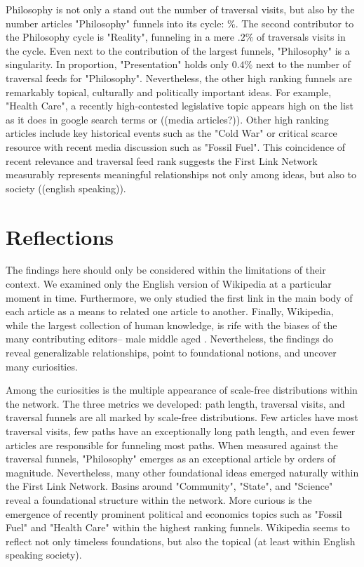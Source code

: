 \documentclass[twoside]{article}
\newcommand{\red}[1]{{\leavevmode\color{sred}{#1}}} %
\begin{document}
Philosophy is not only a stand out the number of traversal visits, but also by the number articles "Philosophy" funnels into
its cycle: \red{[[99.something]]} $\%$. 
The second contributor to the Philosophy cycle is "Reality", funneling in a mere $.2\%$ of traversals visits in the cycle.
Even next to the contribution of the largest funnels, "Philosophy" is a singularity. 
In proportion, "Presentation" holds only $0.4\%$ next to the number of traversal feeds for "Philosophy".
Nevertheless, the other high ranking funnels are remarkably topical, culturally and politically important ideas.  For example, "Health Care", a recently high-contested legislative topic \red{[[add google results trend]]} appears high on the list
as it does in google search terms or ((media articles?)).
Other high ranking articles include key historical events such as the "Cold War" or critical scarce resource with recent 
media discussion such as "Fossil Fuel".
This coincidence of recent relevance and traversal feed rank suggests the First Link Network measurably represents
meaningful relationships not only among ideas, but also to society ((english speaking)). 


\section{Reflections}

The findings here should only be considered within the limitations of their context.
We examined only the English version of Wikipedia at a particular moment in time.
Furthermore, we only studied the first link in the main body of each article
as a means to related one article to another. Finally, Wikipedia, while the largest 
collection of human knowledge, is rife with the biases of the many contributing editors--
male middle aged \red{[[substantiate and confirm]]}. Nevertheless, the findings do reveal
generalizable relationships, point to foundational notions, and uncover many curiosities.


Among the curiosities is the multiple appearance of scale-free distributions within the network. 
The three metrics we developed: path length, traversal visits, and traversal funnels are all marked 
by scale-free distributions. Few articles have most traversal visits, few paths have an exceptionally long path length, and even fewer
articles are responsible for funneling most paths. When measured against the traversal funnels, 
"Philosophy" emerges as an exceptional article by orders of magnitude. 
Nevertheless, many other foundational ideas emerged naturally within the First Link Network. 
Basins around "Community", "State", and "Science" reveal a foundational structure within the network. 
More curious is the emergence of recently prominent political and economics topics such as "Fossil Fuel" and "Health Care" 
within the highest ranking funnels. 
Wikipedia seems to reflect not only timeless foundations, but also the topical (at least within English speaking society).
\end{document}
